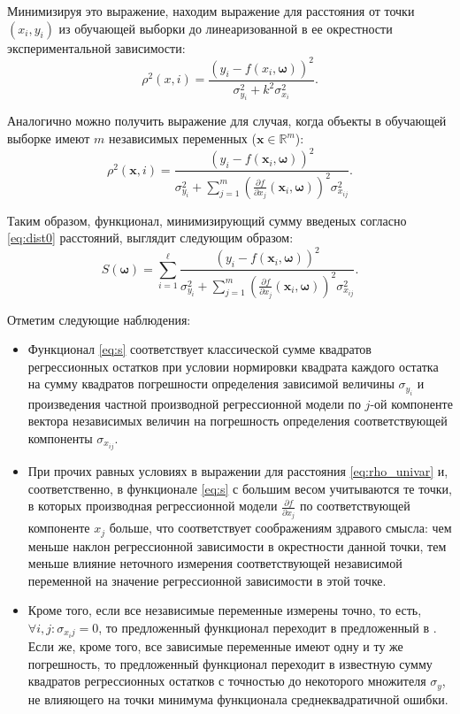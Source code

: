 \documentclass[11pt,a4paper]{article}
\newcommand{\bomega}{\boldsymbol{\omega}}
\begin{document}
Минимизируя это выражение, находим выражение для расстояния от
точки $(x_i, y_i)$ из обучающей выборки до линеаризованной в ее
окрестности экспериментальной зависимости:
\begin{equation}
  \rho^2(x, i) = \frac{(y_i - f(x_i, \bomega))^2}{\sigma^2_{y_i} + k^2 \sigma^2_{x_i}}.
  \label{eq:rho_univar}
\end{equation}

Аналогично можно получить выражение для случая, когда объекты в обучающей выборке
имеют $m$ независимых переменных ($\mathbf{x} \in \mathbb{R}^m$):
\[
  \rho^2(\mathbf{x}, i) = \frac{(y_i - f(\mathbf{x}_i, \bomega))^2}{\sigma_{y_i}^2 + \sum_{j = 1}^m (\frac{\partial f}{\partial x_j}(\mathbf{x}_i, \bomega))^2 \sigma^2_{x_{ij}}}.
\]

Таким образом, функционал, минимизирующий сумму введеных согласно \eqref{eq:dist0}
расстояний, выглядит следующим образом:
\begin{equation}
  S(\bomega) = \sum_{i = 1}^\ell \frac{(y_i - f(\mathbf{x}_i, \bomega))^2}{\sigma_{y_i}^2 + \sum_{j = 1}^m (\frac{\partial f}{\partial x_j}(\mathbf{x}_i, \bomega))^2 \sigma^2_{x_{ij}}}.
  \label{eq:s}
\end{equation}

Отметим следующие наблюдения:
\begin{itemize}
  \item Функционал \eqref{eq:s} соответствует классической сумме квадратов регрессионных
	остатков при условии нормировки квадрата каждого остатка на сумму квадратов погрешности
	определения зависимой величины $\sigma_{y_i}$ и произведения частной производной
	регрессионной модели по $j$-ой компоненте вектора независимых величин на погрешность
	определения соответствующей компоненты $\sigma_{x_{ij}}$.

  \item При прочих равных условиях в выражении для расстояния \eqref{eq:rho_univar} и,
	соответственно, в функционале \eqref{eq:s} с большим весом учитываются те точки, в которых
	производная регрессионной модели $\frac{\partial f}{\partial x_j}$ по соответствующей
	компоненте $x_j$ больше, что соответствует соображениям здравого смысла: чем меньше наклон
	регрессионной зависимости в окрестности данной точки, тем меньше влияние неточного
	измерения соответствующей независимой переменной на значение регрессионной зависимости
	в этой точке.

  \item Кроме того, если все независимые переменные измерены точно, то есть,
	$\forall i, j : \sigma_{x_ij} = 0$, то предложенный функционал переходит в предложенный
	в \cite{jukic2013nonlinear}. Если же, кроме того, все зависимые переменные имеют одну и ту же погрешность,
	то предложенный функционал переходит в известную сумму квадратов регрессионных остатков
	с точностью до некоторого множителя $\sigma_y$, не влияющего на точки минимума функционала
	среднеквадратичной ошибки.
\end{itemize}
\end{document}
